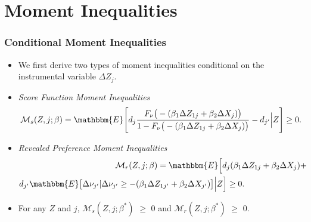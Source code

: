 \documentclass[notes=show]{beamer}
\begin{document}
\section{Moment Inequalities}
\begin{frame}
\frametitle{Conditional Moment Inequalities}

\begin{itemize}
	\item We first derive two types of moment inequalities conditional on the instrumental variable $\Delta Z_{j}$.
	\item \textit{Score Function Moment Inequalities}
	\begin{align*}
	\mathcal{M}_{s}(Z,j;\beta)=\mathbbm{E}\Bigg[d_{j}\frac{F_{\nu}\big(-(\beta_{1}\Delta Z_{1j}+\beta_{2}\Delta X_{j})\big)}{1-F_{\nu}\big(-(\beta_{1}\Delta Z_{1j}+\beta_{2}\Delta X_{j})\big)}-d_{j'}\Big|Z\Bigg]\geq 0.
	\end{align*}
	\item \textit{Revealed Preference Moment Inequalities}
          \begin{align*}
	&\hspace{1.6in}\mathcal{M}_{r}(Z,j;\beta)=\mathbbm{E}\Big[d_{j}(\beta_{1}\Delta Z_{1j}+\beta_{2}\Delta X_{j})+\nonumber\\
	&d_{j'}\mathbbm{E}\big[\Delta\nu_{j'}|\Delta\nu_{j'}\geq-(\beta_{1}\Delta Z_{1j'}+\beta_{2}\Delta X_{j'})\big]\Big|Z\Big]\geq 0.
	\end{align*}
	\item For any $Z$ and $j$, $\mathcal{M}_{s}(Z,j;\beta^{*})$ $\geq$ $0$ and $\mathcal{M}_{r}(Z,j;\beta^{*})$ $\geq$ $0$.

\end{itemize}
\end{frame}
\end{document}
